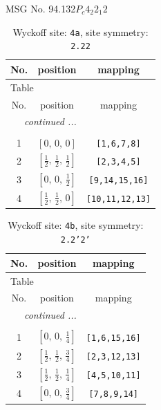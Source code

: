 \documentclass[fleqn,8pt]{jsarticle}
\begin{document}
\setcounter{MaxMatrixCols}{32}

\renewcommand{\tablename}{Table~}
\renewcommand{\figurename}{Figure~}
\begin{center}
\LARGE
MSG No. 94.132\quad$P_{c}4_{2}2_{1}2$
\end{center}
\renewcommand{\arraystretch}{1.2}
\begin{longtable}{ccc}
\caption{Wyckoff site: {\tt 4a}, site symmetry: {\tt 2.22}}
 \\
 \hline \hline
No. & position & mapping \\ \hline \endfirsthead

\multicolumn{2}{l}{\tablename\ \thetable{}} \\
 \hline \hline
No. & position & mapping \\ \hline \endhead

 \hline \hline
\multicolumn{2}{r}{\footnotesize\it continued ...} \\ \endfoot

 \hline \hline
\multicolumn{2}{r}{} \\ \endlastfoot

1 & $\left[ 0,\, 0,\, 0 \right]$ & {\tt [1,6,7,8]} \\ \hline
2 & $\left[ \frac{1}{2},\, \frac{1}{2},\, \frac{1}{2} \right]$ & {\tt [2,3,4,5]} \\ \hline
3 & $\left[ 0,\, 0,\, \frac{1}{2} \right]$ & {\tt [9,14,15,16]} \\ \hline
4 & $\left[ \frac{1}{2},\, \frac{1}{2},\, 0 \right]$ & {\tt [10,11,12,13]} \\
\end{longtable}
\renewcommand{\arraystretch}{1.2}
\begin{longtable}{ccc}
\caption{Wyckoff site: {\tt 4b}, site symmetry: {\tt 2.2'2'}}
 \\
 \hline \hline
No. & position & mapping \\ \hline \endfirsthead

\multicolumn{2}{l}{\tablename\ \thetable{}} \\
 \hline \hline
No. & position & mapping \\ \hline \endhead

 \hline \hline
\multicolumn{2}{r}{\footnotesize\it continued ...} \\ \endfoot

 \hline \hline
\multicolumn{2}{r}{} \\ \endlastfoot

1 & $\left[ 0,\, 0,\, \frac{1}{4} \right]$ & {\tt [1,6,15,16]} \\ \hline
2 & $\left[ \frac{1}{2},\, \frac{1}{2},\, \frac{3}{4} \right]$ & {\tt [2,3,12,13]} \\ \hline
3 & $\left[ \frac{1}{2},\, \frac{1}{2},\, \frac{1}{4} \right]$ & {\tt [4,5,10,11]} \\ \hline
4 & $\left[ 0,\, 0,\, \frac{3}{4} \right]$ & {\tt [7,8,9,14]} \\
\end{longtable}
\end{document}

